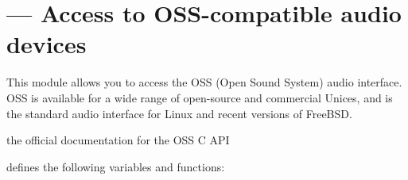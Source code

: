 \section{ ---
         Access to OSS-compatible audio devices}



This module allows you to access the OSS (Open Sound System) audio
interface.  OSS is available for a wide range of open-source and
commercial Unices, and is the standard audio interface for Linux and
recent versions of FreeBSD.

%
%
%
%
%

\begin{seealso}
 {the official
         documentation for the OSS C API}
\end{seealso}

 defines the following variables and functions:

